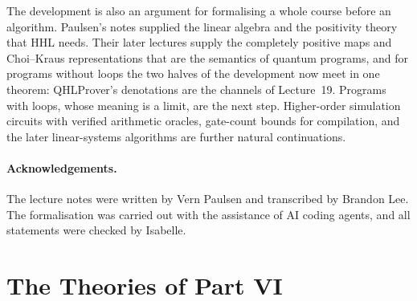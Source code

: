\documentclass[runningheads]{llncs}
\begin{document}
The development is also an argument for formalising a whole course before an algorithm. Paulsen's
notes supplied the linear algebra and the positivity theory that HHL needs. Their later lectures
supply the completely positive maps and Choi--Kraus representations that are the semantics of quantum
programs, and for programs without loops the two halves of the development now meet in one theorem:
QHLProver's denotations are the channels of Lecture~19. Programs with loops, whose meaning is a limit,
are the next step. Higher-order simulation circuits with
verified arithmetic oracles, gate-count bounds for compilation, and the later linear-systems algorithms
are further natural continuations.

\paragraph{Acknowledgements.} The lecture notes were written by Vern Paulsen and transcribed by Brandon
Lee. The formalisation was carried out with the assistance of AI coding agents, and all statements were
checked by Isabelle.



\appendix
\section{The Theories of Part VI}\label{app:theories}
\end{document}

